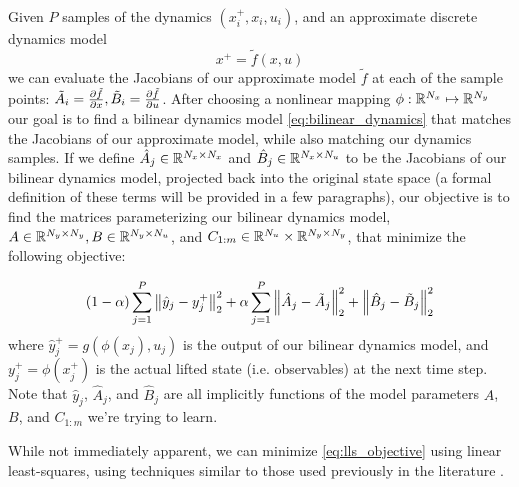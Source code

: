 \documentclass{article}
\begin{document}
Given $P$ samples of the dynamics $(x_i^+, x_i, u_i)$, and an approximate discrete
dynamics model 
\begin{equation}
  x^+ = \tilde{f}(x,u)
\end{equation}
we can evaluate the Jacobians of our approximate model $\tilde{f}$ at each of the sample
points: $\tilde{A}_i = \pdv{\tilde{f}}{x}, \tilde{B}_i = \pdv{\tilde{f}}{u}$. After
choosing a nonlinear mapping $\phi : \mathbb{R}^{N_x} \mapsto \mathbb{R}^{N_y}$ our goal is to find a
bilinear dynamics model \eqref{eq:bilinear_dynamics} that matches the Jacobians of our
approximate model, while also matching our dynamics samples. If we define $\hat{A}_j \in
\mathbb{R}^{N_x \times N_x}$ and $\hat{B}_j \in \mathbb{R}^{N_x \times N_u}$ to be the Jacobians of our
bilinear dynamics model, projected back into the original state space (a formal definition
of these terms will be provided in a few paragraphs), our objective is to find the
matrices parameterizing our bilinear dynamics model, $A \in \mathbb{R}^{N_y \times N_y},B \in
\mathbb{R}^{N_y \times N_u}$, and $C_{1:m} \in \mathbb{R}^{N_u} \times \mathbb{R}^{N_y \times N_y}$, that minimize
the following objective:

\begin{equation} \label{eq:lls_objective}
  (1- \alpha) \sum_{j=1}^P \norm{\hat{y}_j - y_j^+}_2^2 + 
  \alpha  \sum_{j=1}^P \norm{\hat{A}_j - \tilde{A}_j}_2^2 + 
  \norm{\hat{B}_j - \tilde{B}_j}_2^2 
\end{equation}
where $\hat{y}_j^+ = g\left(\phi(x_j), u_j\right)$ is the output of our bilinear dynamics
model, and $y_j^+ = \phi(x_j^+)$ is the actual lifted state (i.e. observables) at the next
time step. Note that $\hat{y}_j$, $\hat{A}_j$, and $\hat{B}_j$ are all implicitly
functions of the model parameters $A$, $B$, and $C_{1:m}$ we're trying to learn.

While not immediately apparent, we can minimize \eqref{eq:lls_objective} using linear
least-squares, using techniques similar to those used previously in the literature
\cite{Folkestad2021}.
\end{document}
